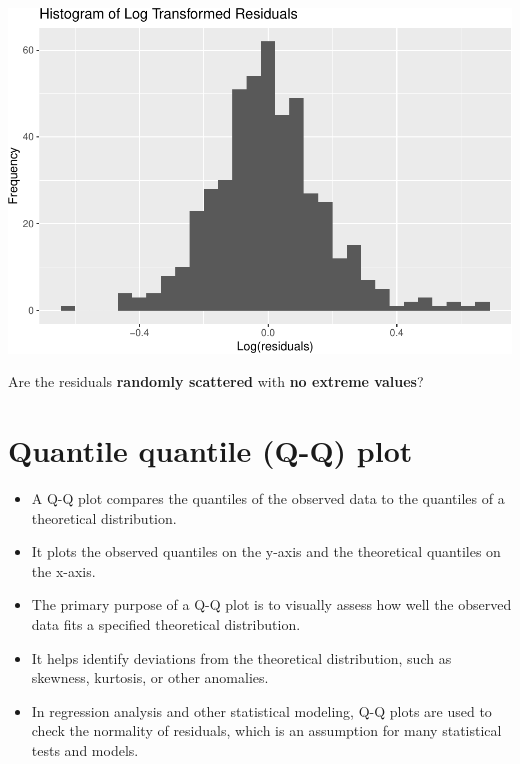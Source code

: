 \documentclass[
]{article}
\providecommand{\tightlist}{%
  \setlength{\itemsep}{0pt}\setlength{\parskip}{0pt}}
\begin{document}
\includegraphics{L9_Regression_model_fitting_pdf_files/figure-latex/unnamed-chunk-11-1.pdf}

Are the residuals \textbf{randomly scattered} with \textbf{no extreme
values}?

\hypertarget{quantile-quantile-q-q-plot}{%
\section{Quantile quantile (Q-Q)
plot}\label{quantile-quantile-q-q-plot}}

\begin{itemize}
\tightlist
\item
  A Q-Q plot compares the quantiles of the observed data to the
  quantiles of a theoretical distribution.
\item
  It plots the observed quantiles on the y-axis and the theoretical
  quantiles on the x-axis.
\item
  The primary purpose of a Q-Q plot is to visually assess how well the
  observed data fits a specified theoretical distribution.
\end{itemize}

\begin{itemize}
\tightlist
\item
  It helps identify deviations from the theoretical distribution, such
  as skewness, kurtosis, or other anomalies.
\item
  In regression analysis and other statistical modeling, Q-Q plots are
  used to check the normality of residuals, which is an assumption for
  many statistical tests and models.
\end{itemize}
\end{document}
